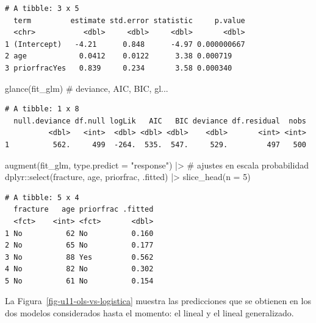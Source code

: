 \documentclass[
  letterpaper,
  DIV=11,
  numbers=noendperiod]{scrartcl}
\newenvironment{Shaded}{\begin{snugshade}}{\end{snugshade}}
\newcommand{\AttributeTok}[1]{\textcolor[rgb]{0.40,0.45,0.13}{#1}}
\newcommand{\CommentTok}[1]{\textcolor[rgb]{0.37,0.37,0.37}{#1}}
\newcommand{\DecValTok}[1]{\textcolor[rgb]{0.68,0.00,0.00}{#1}}
\newcommand{\FunctionTok}[1]{\textcolor[rgb]{0.28,0.35,0.67}{#1}}
\newcommand{\NormalTok}[1]{\textcolor[rgb]{0.00,0.23,0.31}{#1}}
\newcommand{\SpecialCharTok}[1]{\textcolor[rgb]{0.37,0.37,0.37}{#1}}
\newcommand{\StringTok}[1]{\textcolor[rgb]{0.13,0.47,0.30}{#1}}
\begin{document}
\begin{verbatim}
# A tibble: 3 x 5
  term         estimate std.error statistic     p.value
  <chr>           <dbl>     <dbl>     <dbl>       <dbl>
1 (Intercept)   -4.21      0.848      -4.97 0.000000667
2 age            0.0412    0.0122      3.38 0.000719   
3 priorfracYes   0.839     0.234       3.58 0.000340   
\end{verbatim}

\begin{Shaded}
\begin{Highlighting}[]
\FunctionTok{glance}\NormalTok{(fit\_glm)                                   }\CommentTok{\# deviance, AIC, BIC, gl...}
\end{Highlighting}
\end{Shaded}

\begin{verbatim}
# A tibble: 1 x 8
  null.deviance df.null logLik   AIC   BIC deviance df.residual  nobs
          <dbl>   <int>  <dbl> <dbl> <dbl>    <dbl>       <int> <int>
1          562.     499  -264.  535.  547.     529.         497   500
\end{verbatim}

\begin{Shaded}
\begin{Highlighting}[]
\FunctionTok{augment}\NormalTok{(fit\_glm, }\AttributeTok{type.predict =} \StringTok{"response"}\NormalTok{) }\SpecialCharTok{|\textgreater{}}    \CommentTok{\# ajustes en escala probabilidad}
\NormalTok{  dplyr}\SpecialCharTok{::}\FunctionTok{select}\NormalTok{(fracture, age, priorfrac, .fitted) }\SpecialCharTok{|\textgreater{}}
  \FunctionTok{slice\_head}\NormalTok{(}\AttributeTok{n =} \DecValTok{5}\NormalTok{)}
\end{Highlighting}
\end{Shaded}

\begin{verbatim}
# A tibble: 5 x 4
  fracture   age priorfrac .fitted
  <fct>    <int> <fct>       <dbl>
1 No          62 No          0.160
2 No          65 No          0.177
3 No          88 Yes         0.562
4 No          82 No          0.302
5 No          61 No          0.154
\end{verbatim}

La Figura~\ref{fig-u11-ols-vs-logistica} muestra las predicciones que se
obtienen en los dos modelos considerados hasta el momento: el lineal y
el lineal generalizado.
\end{document}
